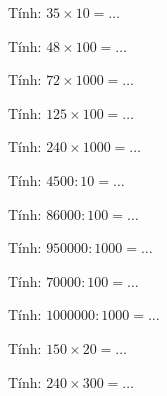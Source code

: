 \begin{ex}
Tính: $35 \times 10 = \dots$
\end{ex}

\begin{ex}
Tính: $48 \times 100 = \dots$
\end{ex}

\begin{ex}
Tính: $72 \times 1000 = \dots$
\end{ex}

\begin{ex}
Tính: $125 \times 100 = \dots$
\end{ex}

\begin{ex}
Tính: $240 \times 1000 = \dots$
\end{ex}

\begin{ex}
Tính: $4500 : 10 = \dots$
\end{ex}

\begin{ex}
Tính: $86000 : 100 = \dots$
\end{ex}

\begin{ex}
Tính: $950000 : 1000 = \dots$
\end{ex}

\begin{ex}
Tính: $70000 : 100 = \dots$
\end{ex}

\begin{ex}
Tính: $1000000 : 1000 = \dots$
\end{ex}

\begin{ex}
Tính: $150 \times 20 = \dots$
\end{ex}

\begin{ex}
Tính: $240 \times 300 = \dots$
\end{ex}

